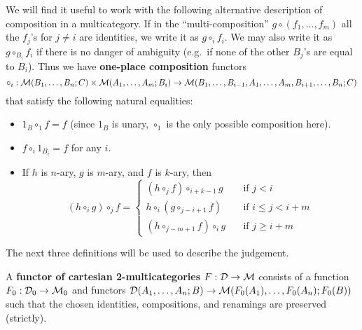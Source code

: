 %
We will find it useful to work with the following alternative description of composition in a multicategory.
If in the ``multi-composition'' $g\circ (f_1,\dots,f_m)$ all the $f_j$'s for $j\neq i$ are identities, we write it as $g \circ_i f_i$.
We may also write it as $g\circ_{B_i} f_i$ if there is no danger of ambiguity (e.g.\ if none of the other $B_j$'s are equal to $B_i$). 
Thus we have \textbf{one-place composition} functors
\[
  \circ_i : \mathcal{M}(B_1,\dots,B_n;C) \times \mathcal{M}(A_1,\dots,A_m;B_i) \\
  \to \mathcal{M}(B_1,\dots,B_{i-1},A_1,\dots,A_m,B_{i+1},\dots,B_n;C)
\]
that satisfy the following natural equalities:
\begin{itemize}
\item $1_B \circ_1 f = f$ (since $1_B$ is unary, $\circ_1$ is the only possible composition here).
\item $f\circ_i 1_{B_i} = f$ for any $i$.
\item If $h$ is $n$-ary, $g$ is $m$-ary, and $f$ is $k$-ary, then
  \[ (h \circ_i g) \circ_{j} f=
  \begin{cases}
    (h\circ_j f)\circ_{i+k-1} g &\quad \text{if } j < i\\
    h\circ_i (g\circ_{j-i+1} f) &\quad \text{if } i \le j < i+m\\
    (h\circ_{j-m+1} f)\circ_{i} g &\quad \text{if } j \ge i+m
  \end{cases}
  \]
\end{itemize}



The next three definitions will be used to describe the
 judgement.  

\begin{definition}
  A \textbf{functor of cartesian 2-multicategories} $F:\mathcal{D}\to\mathcal{M}$ consists
  of a function $F_0 : \mathcal{D}_0 \to \mathcal{M}_0$ and functors $\mathcal{D}(A_1,\ldots,A_n;B)
  \to \mathcal{M}(F_0(A_1),\ldots,F_0(A_n);F_0(B))$ such that the chosen
  identities, compositions, and renamings are preserved (strictly).
\end{definition}

